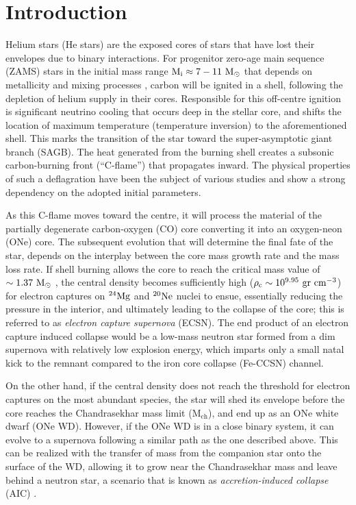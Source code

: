 \documentclass[../../main/thesis_msc.tex]{subfiles}
\begin{document}
\section{Introduction} \label{sec:introduction}
Helium stars (He stars) are the exposed cores of stars that have lost their envelopes due to binary interactions. For progenitor zero-age main sequence (ZAMS) stars in the initial mass range $\rm M_i \approx  7 - 11 \ M_{\odot}$ that depends on metallicity and mixing processes 
\citep[e.g.][]{Ritossa1996, Ritossa1999, GilPons2005, siess2006, Poelarends2008, Farmer:2015afs}, carbon will be ignited in a shell, following the depletion of helium supply in their cores. Responsible for this off-centre ignition is significant neutrino cooling that occurs deep in the stellar core, and shifts the location of maximum temperature (temperature inversion) to the aforementioned shell. This marks the transition of the star toward the super-asymptotic giant branch (SAGB). The heat generated from the burning shell creates a subsonic carbon-burning front (``C-flame'') that propagates inward. The physical properties of such a deflagration have been the subject of various studies \citep[e.g.][]{Timmes_1994, siess2006, Siess2009, Denissenkov:2013qaa, Farmer:2015afs} and show a strong dependency on the adopted initial parameters.

As this C-flame moves toward the centre, it will process the material of the partially degenerate carbon-oxygen (CO) core converting it into an oxygen-neon (ONe) core. The subsequent evolution that will determine the final fate of the star, depends on the interplay between the core mass growth rate and the mass loss rate. If shell burning allows the core to reach the critical mass value of $\rm \sim 1.37 \ M_{\odot}$ \citep{Nomoto1984}, the central density becomes sufficiently high ($\rm \rho_c \sim 10^{9.95} \ gr \ cm^{-3}$) for electron captures on $\rm ^{24}Mg$ and $\rm ^{20}Ne$ nuclei to ensue, essentially reducing the pressure in the interior, and ultimately leading to the collapse of the core; this is referred to as \textit{electron capture supernova} (ECSN).
The end product of an electron capture induced collapse would be a low-mass neutron star formed from a dim supernova \citep[e.g.][and references therein]{Fischer2010} with relatively low explosion energy, which imparts only a small natal kick to the remnant \citep{Knigge2011, Jones_2013, Jones2016} compared to the iron core collapse (Fe-CCSN) channel.

On the other hand, if the central density does not reach the threshold for electron captures on the most abundant species, the star will shed its envelope before the core reaches the Chandrasekhar mass limit (M$_{\text{ch}}$), and end up as an ONe white dwarf (ONe WD). However, if the ONe WD is in a close binary system, it can evolve to a supernova following a similar path as the one described above. This can be realized with the transfer of mass from the companion star onto the surface of the WD, allowing it to grow near the Chandrasekhar mass and leave behind a neutron star, a scenario that is known as \textit{accretion-induced collapse} (AIC) \citep[e.g.][]{nomoto1991, Schwab:2015bma, Brooks2017a, Schwab:2018cnb}.
\end{document}
